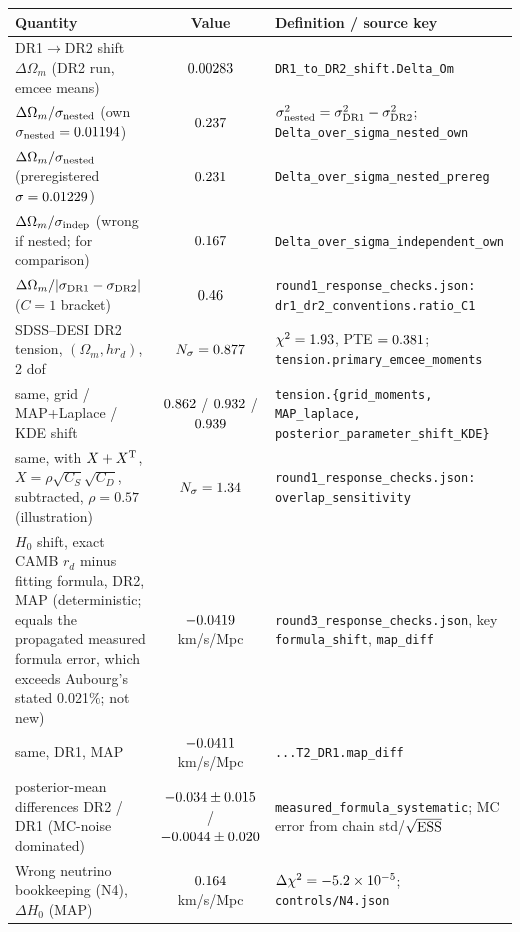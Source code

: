 \begin{tabular}{p{6.3cm}cp{8.8cm}}
\toprule
Quantity & Value & Definition / source key \\
\midrule
DR1$\to$DR2 shift $\Delta\Omega_m$ (DR2 run, emcee means) & $0.00283$ & \scriptsize \texttt{DR1\_to\_DR2\_shift.Delta\_Om} \\
$\Delta\Omega_m/\sigma_{\rm nested}$ (own $\sigma_{\rm nested}=0.01194$) & $0.237$ & \scriptsize $\sigma_{\rm nested}^2=\sigma_{\rm DR1}^2-\sigma_{\rm DR2}^2$; \texttt{Delta\_over\_sigma\_nested\_own} \\
$\Delta\Omega_m/\sigma_{\rm nested}$ (preregistered $\sigma=0.01229$) & $0.231$ & \scriptsize \texttt{Delta\_over\_sigma\_nested\_prereg} \\
$\Delta\Omega_m/\sigma_{\rm indep}$ (wrong if nested; for comparison) & $0.167$ & \scriptsize \texttt{Delta\_over\_sigma\_independent\_own} \\
$\Delta\Omega_m/|\sigma_{\rm DR1}-\sigma_{\rm DR2}|$ ($C=1$ bracket) & $0.46$ & \scriptsize \texttt{round1\_response\_checks.json: dr1\_dr2\_conventions.ratio\_C1} \\
SDSS--DESI DR2 tension, $(\Omega_m, h r_d)$, 2 dof & $N_\sigma=0.877$ & \scriptsize $\chi^2=1.93$, PTE $=0.381$; \texttt{tension.primary\_emcee\_moments} \\
\quad same, grid / MAP+Laplace / KDE shift & $0.862$ / $0.932$ / $0.939$ & \scriptsize \texttt{tension.\{grid\_moments, MAP\_laplace, posterior\_parameter\_shift\_KDE\}} \\
\quad same, with $X+X^{\rm T}$, $X=\rho\sqrt{C_S}\sqrt{C_D}$, subtracted, $\rho=0.57$ (illustration) & $N_\sigma=1.34$ & \scriptsize \texttt{round1\_response\_checks.json: overlap\_sensitivity} \\
$H_0$ shift, exact CAMB $r_d$ minus fitting formula, DR2, MAP (deterministic; equals the propagated measured formula error, which exceeds Aubourg's stated 0.021\%; not new) & $-0.0419$ km/s/Mpc & \scriptsize \texttt{round3\_response\_checks.json}, key \texttt{formula\_shift}, \texttt{map\_diff} \\
\quad same, DR1, MAP & $-0.0411$ km/s/Mpc & \scriptsize \texttt{...T2\_DR1.map\_diff} \\
\quad posterior-mean differences DR2 / DR1 (MC-noise dominated) & $-0.034\pm0.015$ / $-0.0044\pm0.020$ & \scriptsize \texttt{measured\_formula\_systematic}; MC error from chain std/$\sqrt{\rm ESS}$ \\
Wrong neutrino bookkeeping (N4), $\Delta H_0$ (MAP) & $0.164$ km/s/Mpc & \scriptsize $\Delta\chi^2=-5.2\times10^{-5}$; \texttt{controls/N4.json} \\
\bottomrule
\end{tabular}
